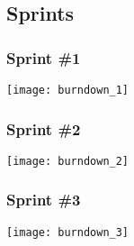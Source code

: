 \subsection{Sprints}

\subsubsection{Sprint \#1}

\begin{center}
	\texttt{[image: burndown\_1]}
\end{center}

\subsubsection{Sprint \#2}

\begin{center}
	\texttt{[image: burndown\_2]}
\end{center}

\subsubsection{Sprint \#3}

\begin{center}
	\texttt{[image: burndown\_3]}
\end{center}
